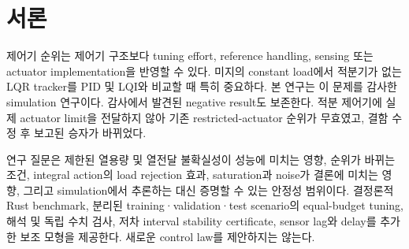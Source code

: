 \section{서론}\label{sec:introduction}
제어기 순위는 제어기 구조보다 tuning effort, reference handling, sensing 또는 actuator implementation을 반영할 수 있다. 미지의 constant load에서 적분기가 없는 LQR tracker를 PID 및 LQI와 비교할 때 특히 중요하다. 본 연구는 이 문제를 감사한 simulation 연구이다. 감사에서 발견된 negative result도 보존한다. 적분 제어기에 실제 actuator limit을 전달하지 않아 기존 restricted-actuator 순위가 무효였고, 결함 수정 후 보고된 승자가 바뀌었다.

연구 질문은 제한된 열용량 및 열전달 불확실성이 성능에 미치는 영향, 순위가 바뀌는 조건, integral action의 load rejection 효과, saturation과 noise가 결론에 미치는 영향, 그리고 simulation에서 추론하는 대신 증명할 수 있는 안정성 범위이다. 결정론적 Rust benchmark, 분리된 training·validation·test scenario의 equal-budget tuning, 해석 및 독립 수치 검사, 저차 interval stability certificate, sensor lag와 delay를 추가한 보조 모형을 제공한다. 새로운 control law를 제안하지는 않는다.
